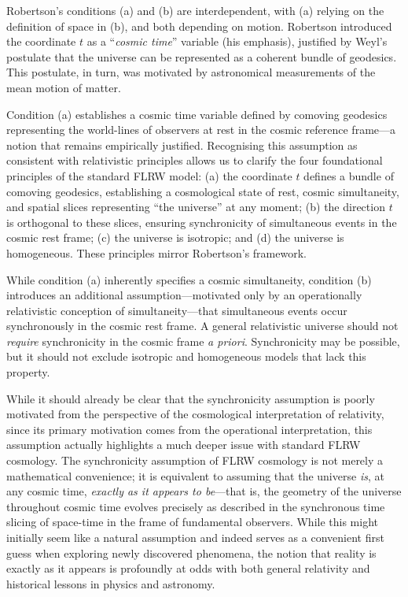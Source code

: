 \documentclass[aps,rmp,groupedaddress,twocolumn,10pt]{revtex4-2}
\begin{document}
Robertson's conditions (a) and (b) are interdependent, with (a) relying on the definition of space in (b), and both depending on motion. Robertson introduced the coordinate $t$ as a ``\textit{cosmic time}'' variable (his emphasis), justified by Weyl's postulate that the universe can be represented as a coherent bundle of geodesics. This postulate, in turn, was motivated by astronomical measurements of the mean motion of matter.

Condition (a) establishes a cosmic time variable defined by comoving geodesics representing the world-lines of observers at rest in the cosmic reference frame---a notion that remains empirically justified. Recognising this assumption as consistent with relativistic principles allows us to clarify the four foundational principles of the standard FLRW model: (a) the coordinate $t$ defines a bundle of comoving geodesics, establishing a cosmological state of rest, cosmic simultaneity, and spatial slices representing ``the universe'' at any moment; (b) the direction $t$ is orthogonal to these slices, ensuring synchronicity of simultaneous events in the cosmic rest frame; (c) the universe is isotropic; and (d) the universe is homogeneous. These principles mirror Robertson's framework.

While condition (a) inherently specifies a cosmic simultaneity, condition (b) introduces an additional assumption---motivated only by an operationally relativistic conception of simultaneity---that simultaneous events occur synchronously in the cosmic rest frame. A general relativistic universe should not \textit{require} synchronicity in the cosmic frame \textit{a priori}. Synchronicity may be possible, but it should not exclude isotropic and homogeneous models that lack this property.

While it should already be clear that the synchronicity assumption is poorly motivated from the perspective of the cosmological interpretation of relativity, since its primary motivation comes from the operational interpretation, this assumption actually highlights a much deeper issue with standard FLRW cosmology. The synchronicity assumption of FLRW cosmology is not merely a mathematical convenience; it is equivalent to assuming that the universe \textit{is}, at any cosmic time, \textit{exactly as it appears to be}---that is, the geometry of the universe throughout cosmic time evolves precisely as described in the synchronous time slicing of space-time in the frame of fundamental observers. While this might initially seem like a natural assumption and indeed serves as a convenient first guess when exploring newly discovered phenomena, the notion that reality is exactly as it appears is profoundly at odds with both general relativity and historical lessons in physics and astronomy.
\end{document}
